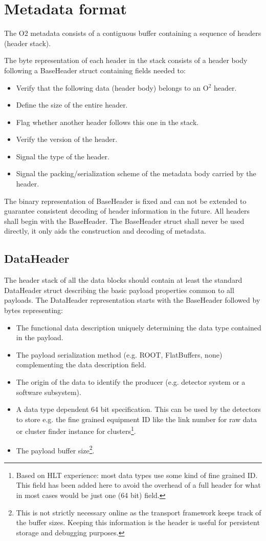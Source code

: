 \documentclass[a4paper,twoside]{article}
\def\O2{O$^2$}
\begin{document}
\section{Metadata format}\label{sec:header}

The O2 metadata consists of a contiguous buffer containing a sequence of headers (header stack).

The byte representation of each header in the stack consists of a header body following a BaseHeader struct containing fields needed to:
\begin{itemize}
  \item Verify that the following data (header body) belongs to an \O2 header.
  \item Define the size of the entire header.
  \item Flag whether another header follows this one in the stack.
  \item Verify the version of the header.
  \item Signal the type of the header.
  \item Signal the packing/serialization scheme of the metadata body carried by the header.
\end{itemize}

The binary representation of BaseHeader is fixed and can not be extended to guarantee consistent decoding of header information in the future. All headers shall begin with the BaseHeader. The BaseHeader struct shall never be used directly, it only aids the construction and decoding of metadata.

\subsection{DataHeader}
The header stack of all the data blocks should contain at least the standard DataHeader struct describing the basic payload properties common to all payloads.
The DataHeader representation starts with the BaseHeader followed by bytes representing:
\begin{itemize}
  \item The functional data description uniquely determining the data type contained in the payload.
  \item The payload serialization method (e.g. ROOT, FlatBuffers, none) complementing the data description field.
  \item The origin of the data to identify the producer (e.g. detector system or a software subsystem).
  \item A data type dependent 64 bit specification. This can be used by the detectors to store e.g. the fine grained equipment ID like the link number for raw data or cluster finder instance for clusters\footnote{Based on HLT experience: most data types use some kind of fine grained ID. This field has been added here to avoid the overhead of a full header for what in most cases would be just one (64 bit) field.}.
  \item The payload buffer size\footnote{This is not strictly necessary online as the transport framework keeps track of the buffer sizes. Keeping this information is the header is useful for persistent storage and debugging purposes.}.
\end{itemize}
\end{document}
